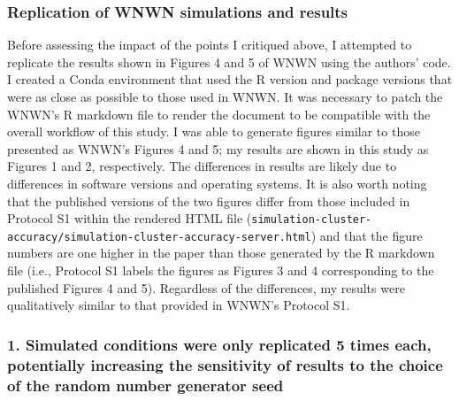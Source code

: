 \documentclass[
]{article}
\begin{document}
\hypertarget{replication-of-wnwn-simulations-and-results}{%
\subsubsection{Replication of WNWN simulations and
results}\label{replication-of-wnwn-simulations-and-results}}

Before assessing the impact of the points I critiqued above, I attempted
to replicate the results shown in Figures 4 and 5 of WNWN using the
authors' code. I created a Conda environment that used the R version and
package versions that were as close as possible to those used in WNWN.
It was necessary to patch the WNWN's R markdown file to render the
document to be compatible with the overall workflow of this study. I was
able to generate figures similar to those presented as WNWN's Figures 4
and 5; my results are shown in this study as Figures 1 and 2,
respectively. The differences in results are likely due to differences
in software versions and operating systems. It is also worth noting that
the published versions of the two figures differ from those included in
Protocol S1 within the rendered HTML file
(\texttt{simulation-cluster-accuracy/simulation-cluster-accuracy-server.html})
and that the figure numbers are one higher in the paper than those
generated by the R markdown file (i.e., Protocol S1 labels the figures
as Figures 3 and 4 corresponding to the published Figures 4 and 5).
Regardless of the differences, my results were qualitatively similar to
that provided in WNWN's Protocol S1.

\hypertarget{simulated-conditions-were-only-replicated-5-times-each-potentially-increasing-the-sensitivity-of-results-to-the-choice-of-the-random-number-generator-seed}{%
\subsubsection{1. Simulated conditions were only replicated 5 times
each, potentially increasing the sensitivity of results to the choice of
the random number generator
seed}\label{simulated-conditions-were-only-replicated-5-times-each-potentially-increasing-the-sensitivity-of-results-to-the-choice-of-the-random-number-generator-seed}}
\end{document}
